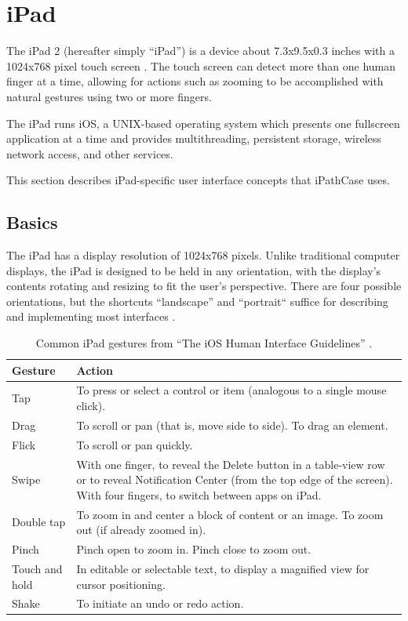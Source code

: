 \section{iPad}
\label{sect:ipad}

The iPad 2 (hereafter simply ``iPad'') is a device about 7.3x9.5x0.3 inches with
a 1024x768 pixel touch screen \cite{ipad:specs}. The touch screen can detect
more than one human finger at a time, allowing for actions such as zooming to be
accomplished with natural gestures using two or more fingers.

The iPad runs iOS, a UNIX-based operating system which presents one fullscreen
application at a time and provides multithreading, persistent storage, wireless
network access, and other services.

This section describes iPad-specific user interface concepts that iPathCase
uses.

\subsection{Basics}
\label{sect:ipad_basics}

The iPad has a display resolution of 1024x768 pixels. Unlike traditional
computer displays, the iPad is designed to be held in any orientation, with the
display's contents rotating and resizing to fit the user's perspective. There
are four possible orientations, but the shortcuts ``landscape'' and ``portrait``
suffice for describing and implementing most interfaces \cite{ios:hig}.

\begin{table}[ht!]
    \centering
    \begin{tabular}{ | p{1in} | p{3in} | }
        \hline
        Gesture & Action
        \\ \hline
        Tap & To press or select a control or item (analogous to a single mouse click).
        \\ \hline
        Drag & To scroll or pan (that is, move side to side). To drag an element.
        \\ \hline
        Flick & To scroll or pan quickly.
        \\ \hline
        Swipe & With one finger, to reveal the Delete button in a table-view row or to reveal Notification Center (from the top edge of the screen).  With four fingers, to switch between apps on iPad.
        \\ \hline
        Double tap & To zoom in and center a block of content or an image.  To zoom out (if already zoomed in).
        \\ \hline
        Pinch & Pinch open to zoom in.  Pinch close to zoom out.
        \\ \hline
        Touch and hold & In editable or selectable text, to display a magnified view for cursor positioning.
        \\ \hline
        Shake & To initiate an undo or redo action.
        \\ \hline
    \end{tabular}
    \caption{\label{table:ipad_gestures}Common iPad gestures from ``The iOS Human Interface Guidelines''
    \cite{ios:hig}.}
\end{table}

